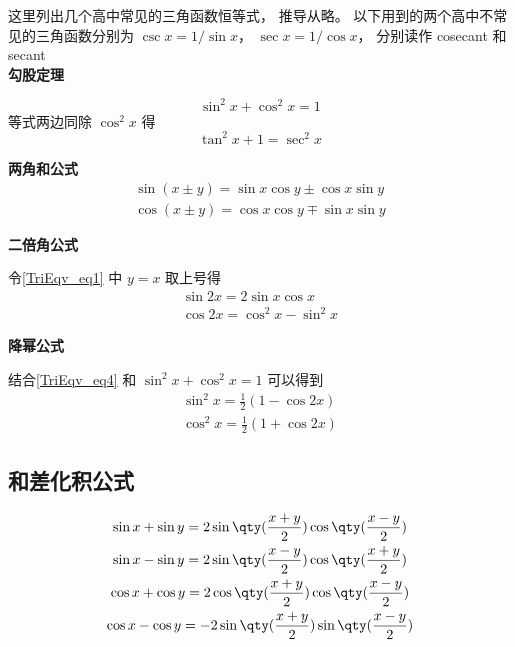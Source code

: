 
这里列出几个高中常见的三角函数恒等式， 推导从略。 以下用到的两个高中不常见的三角函数分别为 $\csc x= 1/\sin x$， $\sec x = 1/\cos x$， 分别读作 cosecant 和 secant\\

\noindent\textbf{勾股定理}

\begin{equation}
\sin^2 x + \cos^2 x = 1
\end{equation}
等式两边同除 $\cos^2 x$ 得
\begin{equation}\label{TriEqv_eq13}
\tan^2 x + 1 = \sec^2 x
\end{equation}

\noindent\textbf{两角和公式}
\begin{gather}\label{TriEqv_eq1}
\sin(x\pm y) = \sin x\cos y \pm \cos x\sin y\\
\cos(x\pm y) = \cos x\cos y \mp \sin x\sin y
\end{gather}

\noindent\textbf{二倍角公式}

令\autoref{TriEqv_eq1} 中 $y=x$ 取上号得
\begin{gather}
\sin 2x = 2\sin x\cos x\\
 \cos 2x = \cos^2 x - \sin^2 x \label{TriEqv_eq4}
\end{gather}

\noindent\textbf{降幂公式}

结合\autoref{TriEqv_eq4} 和 $\sin^2 x + \cos^2 x = 1$ 可以得到
\begin{gather}
\sin^2 x = \frac 12 (1- \cos 2x) \label{TriEqv_eq5} \\
\cos^2 x = \frac 12 (1+\cos 2x) \label{TriEqv_eq6}
\end{gather}

\subsection{和差化积公式}

\begin{gather}
\sin x + \sin y = 2\sin\qty(\frac{x + y}{2})\cos\qty(\frac{x - y}{2})\label{TriEqv_eq7}\\
\sin x - \sin y = 2\sin\qty(\frac{x - y}{2})\cos\qty(\frac{x + y}{2})\label{TriEqv_eq8}\\
\cos x + \cos y = 2\cos\qty(\frac{x+y}{2})\cos\qty(\frac{x-y}{2})\label{TriEqv_eq9}\\
\cos x - \cos y = -2\sin\qty(\frac{x+y}{2})\sin\qty(\frac{x-y}{2})\label{TriEqv_eq10}
\end{gather}

